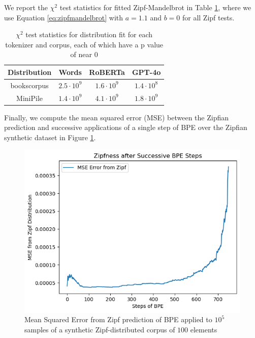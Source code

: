 \documentclass[11pt]{article}
\begin{document}
We report the $\chi^2$ test statistics for fitted Zipf-Mandelbrot in Table \ref{tbl:kstest}, where we use Equation \ref{eq:zipfmandelbrot} with $a=1.1$ and $b=0$ for all Zipf tests. 

\begin{table}
    \centering
    \begin{tabular}{|c|c|c|c|}
        \hline
        \textbf{Distribution} & \textbf{Words} & \textbf{RoBERTa} & \textbf{GPT-4o}  \\
        \hline
        bookscorpus & $2.5 \cdot 10^{9}$ & $1.6 \cdot 10^{9}$ & $1.4 \cdot 10^{8}$  \\
        \hline
        MiniPile &  $1.4 \cdot 10^{9}$ & $4.1 \cdot 10^{9}$ & $1.8 \cdot 10^{9}$ \\
        \hline
    \end{tabular}
    \caption{$\chi^2$ test statistics for distribution fit for each tokenizer and corpus, each of which have a p value of near $0$}
    \label{tbl:kstest}
\end{table}

Finally, we compute the mean squared error (MSE) between the Zipfian prediction and successive applications of a single step of BPE over the Zipfian synthetic dataset in Figure \ref{fig:theoryexperiments}. 

\begin{figure}[t]
  \includegraphics[width=\columnwidth]{../visualizations/zipfnessovertime.png}
  \caption{Mean Squared Error from Zipf prediction of BPE applied to $10^5$ samples of a synthetic Zipf-distributed corpus of $100$ elements}
  \label{fig:theoryexperiments}
\end{figure}
\end{document}
